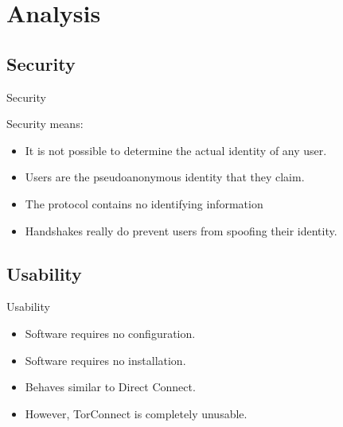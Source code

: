 \documentclass{beamer}
\begin{document}
\section{Analysis}

\subsection{Security}
\begin{frame}{Security}
\begin{block}{Security means:}
\begin{itemize}
\pause
\item It is not possible to determine the actual identity of any user.
\pause
\item Users are the pseudoanonymous identity that they claim.
\end{itemize}
\end{block}

\begin{block}{}
\begin{itemize}
\pause
\item The protocol contains no identifying information

\pause
\item Handshakes really do prevent users from spoofing their identity.

\end{itemize}
\end{block}
\end{frame}

\subsection{Usability}
\begin{frame}{Usability}
\begin{itemize}
\item Software requires no configuration.
\item Software requires no installation.
\item Behaves similar to Direct Connect.
\item However, TorConnect is completely unusable.
\end{itemize}
\end{frame}
\end{document}
